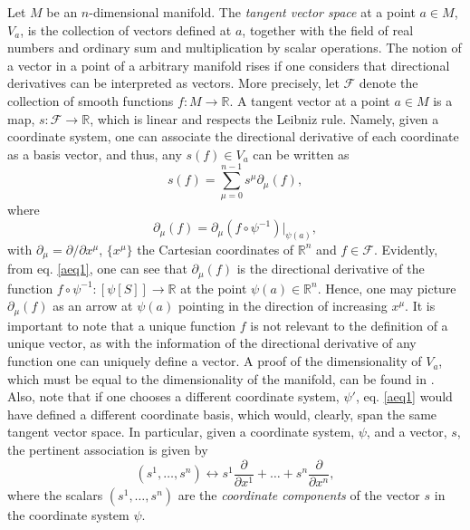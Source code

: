 \documentclass[
12pt,		%
openright,	%
twoside,  %
a4paper,			%
chapter=TITLE,		%
english,			%
french,				%
spanish,			%
brazil				%
]{USPSC-classe/USPSC}
\begin{document}
\begin{apendicesenv}
Let $M$ be an $n$-dimensional manifold. The \textit{tangent vector space} at a point $a\in M$, $V_a$, is the collection of vectors defined at $a$, together with the field of real numbers and ordinary sum and multiplication by scalar operations. The notion of a vector in a point of a arbitrary manifold rises if one considers that directional derivatives can be interpreted as vectors. More precisely, let $\mathcal{F}$ denote the collection of smooth functions $f:M\to\mathbb{R}$. A tangent vector at a point $a\in M$ is a map, $s:\mathcal{F}\to\mathbb{R}$, which is linear and respects the Leibniz rule. Namely, given a coordinate system, one can associate the directional derivative of each coordinate as a basis vector, and thus, any $s(f)\in V_a$ can be written as 
\begin{equation}\label{eq65}
    s(f)=\sum_{\mu=0}^{n-1}s^{\mu}\partial_{\mu}(f),
\end{equation}
where
\begin{equation}\label{aeq1}
    \partial_{\mu}(f)=\partial_{\mu}(f\circ\psi^{-1})\big|_{\psi(a)},
\end{equation}
with $\partial_{\mu}=\partial/\partial x^{\mu}$, $\{x^{\mu}\}$ the Cartesian coordinates of $\mathbb{R}^n$ and $f\in\mathcal{F}$. Evidently, from eq. \ref{aeq1}, one can see that $\partial_{\mu}(f)$ is the directional derivative of the function $f\circ\psi^{-1}:[\psi[S]]\to \mathbb{R}$ at the point $\psi(a)\in\mathbb{R}^n$. Hence, one may picture $\partial_{\mu}(f)$ as an arrow at $\psi(a)$ pointing in the direction of increasing $x^{\mu}$. It is important to note that a unique function $f$ is not relevant to the definition of a unique vector, as with the information of the directional derivative of any function one can uniquely define a vector. A proof of the dimensionality of $V_a$, which must be equal to the dimensionality of the manifold, can be found in \cite{Wald1984}. Also, note that if one chooses a different coordinate system, $\psi'$, eq. \ref{aeq1} would have defined a different coordinate basis, which would, clearly, span the same tangent vector space. In particular, given a coordinate system, $\psi$, and a vector, $s$, the pertinent association is given by
\begin{equation}
    (s^1,\ldots,s^n)\longleftrightarrow s^1\frac{\partial}{\partial x^1}+\ldots+s^n\frac{\partial}{\partial x^n},
\end{equation}
where the scalars $(s^1,\ldots,s^n)$ are the \textit{coordinate components} of the vector $s$ in the coordinate system $\psi$.


\end{apendicesenv}
\end{document}
